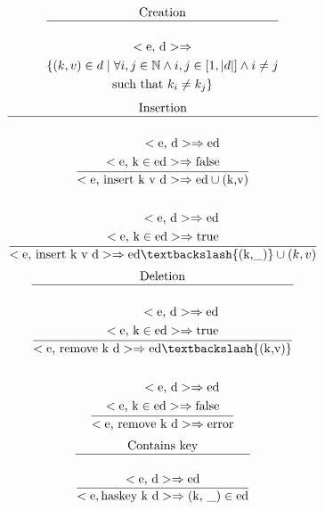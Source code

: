 \documentclass[a4paper, 10pt]{article}
\newcommand{\te}[1]{\text{#1}}
\def\N{\mathbb{N}}
\DeclarePairedDelimiter\abs{\lvert}{\rvert}
\theoremstyle{plain}%
\theoremstyle{definition}
\theoremstyle{remark}
\begin{document}
\begin{multicols}{2}
\begin{gather*}
	\te{Creation} \\
	\hline \\
	<\te{e, d}> \Rightarrow \\ \{ (k,v) \in d \mid \forall i,j \in \N \wedge i,j \in \left[1, \abs{d}\right] \land i \neq j \\ \text{such that } k_i \neq k_j \}
\end{gather*}
\begin{gather*}
	\te{Insertion} \\
	\hline \\
	\dfrac{ \begin{aligned}
		<\te{e, d}> \Rightarrow \te{ed} \\
		<\te{e, k} \in \te{ed}> \Rightarrow \te{false} \\
	\end{aligned} }{<\te{e, insert k v d}> \Rightarrow \te{ed} \cup (\te{k,v})} \\ \\
	\dfrac{ \begin{aligned}
		<\te{e, d}> \Rightarrow \te{ed} \\
		<\te{e, k} \in \te{ed}> \Rightarrow \te{true}
	\end{aligned}}{<\te{e, insert k v d}> \Rightarrow \te{ed} \textbackslash \{(\te{k,\_})\} \cup (k, v) }
\end{gather*}
\begin{gather*}
	\te{Deletion} \\ \hline \\
	\dfrac{	\begin{aligned}
		<\te{e, d}> \Rightarrow \te{ed} \\
		<\te{e, k} \in \te{ed}> \Rightarrow \te{true}
	\end{aligned}}{<\te{e, remove k d}> \Rightarrow \te{ed} \textbackslash \{(\te{k,v})\}} \\ \\
	\dfrac{	\begin{aligned}
		<\te{e, d}> \Rightarrow \te{ed} \\
		<\te{e, k} \in \te{ed}> \Rightarrow \te{false}
	\end{aligned}}{<\te{e, remove k d}> \Rightarrow \te{error}}
\end{gather*}
\begin{gather*}
	\te{Contains key} \\ \hline \\
	\dfrac{<\te{e, d}> \Rightarrow \te{ed}}{<\te{e}, \te{haskey k d}> \Rightarrow (\te{k, \_}) \in \te{ed}}

\end{gather*}
\end{multicols}
\end{document}

